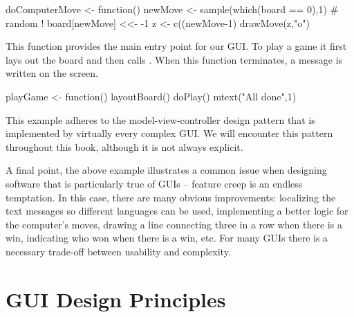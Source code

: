 \begin{Schunk}
\begin{Sinput}
 doComputerMove <- function() {
   newMove <- sample(which(board == 0),1) # random !
   board[newMove] <<- -1    
   z <- c((newMove-1) %
   drawMove(z,"o")
 }
\end{Sinput}
\end{Schunk}


This function provides the main entry point for our GUI. To play a
game it first lays out the board and then calls
. When this function terminates, a message is written
on the screen.
\begin{Schunk}
\begin{Sinput}
 playGame <- function() {
   layoutBoard()
   doPlay()
   mtext("All done\n",1)
 }
\end{Sinput}
\end{Schunk}

This example adheres to the model-view-controller design pattern that
is implemented by virtually every complex GUI. We will encounter this
pattern throughout this book, although it is not always explicit.

A final point, the above example illustrates a common issue when designing
software that is particularly true of GUIs -- feature creep is an
endless temptation. In this case, there are many obvious improvements:
localizing the text messages so different languages can be used,
implementing a better logic for the computer's moves, drawing a line
connecting three in a row when there is a win, indicating who won when
there is a win, etc. For many GUIs there is a necessary trade-off
between usability and complexity.

\section{GUI Design Principles}
\label{sec:GUI:design}





